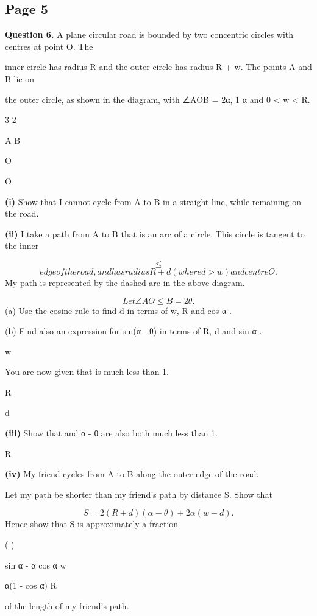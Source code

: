 \documentclass[12pt]{article}
\begin{document}
\subsection*{Page 5}
\begin{flushleft}
\bigskip\textbf{Question 6.} A plane circular road is bounded by two concentric circles with centres at point O. The\par
inner circle has radius R and the outer circle has radius R + w. The points A and B lie on\par
the outer circle, as shown in the diagram, with ∠AOB = 2α, 1 \pi \leq α  \pi and 0 < w < R.\par
3 2\par
A B\par
O\par
O\par
\textbf{(i)} Show that I cannot cycle from A to B in a straight line, while remaining on the road.\par
\textbf{(ii)} I take a path from A to B that is an arc of a circle. This circle is tangent to the inner\par
\[\leq\]
\[edge of the road, and has radius R + d (where d > w) and centre O .\]
My path is represented by the dashed arc in the above diagram.\par
\[Let ∠AO \leq B = 2θ.\]
(a) Use the cosine rule to find d in terms of w, R and cos α .\par
(b) Find also an expression for sin(α - θ) in terms of R, d and sin α .\par
w\par
You are now given that is much less than 1.\par
R\par
d\par
\textbf{(iii)} Show that and α - θ are also both much less than 1.\par
R\par
\textbf{(iv)} My friend cycles from A to B along the outer edge of the road.\par
Let my path be shorter than my friend's path by distance S. Show that\par
\[S = 2(R + d)(α - θ) + 2α(w - d).\]
Hence show that S is approximately a fraction\par
( )\par
sin α - α cos α w\par
α(1 - cos α) R\par
of the length of my friend's path.\par
\end{flushleft}
\end{document}

